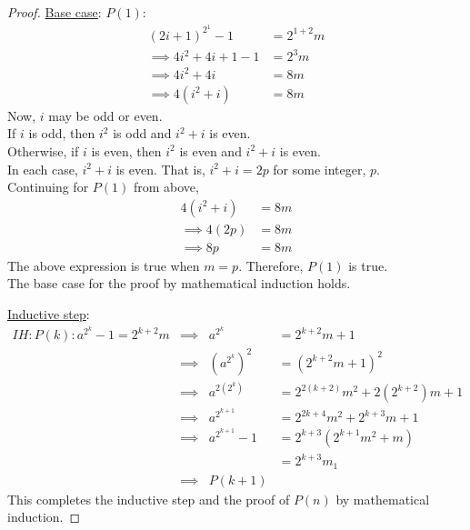 \documentclass[a4paper]{exam}
\begin{document}
\begin{questions}
\begin{parts}
\begin{solution}
\begin{proof}
      \underline{Base case}: $P(1)$:
      \begin{align*}
        (2i+1)^{2^1} -1 &= 2^{1+2}m\\
        \implies 4i^2+4i+1-1 &= 2^3m\\
        \implies 4i^2+4i &= 8m\\
        \implies 4(i^2+i) &= 8m
        \end{align*}
        Now, $i$ may be odd or even.\\
        If $i$ is odd, then $i^2$ is odd and $i^2+i$ is even.\\
        Otherwise, if $i$ is even, then $i^2$ is even and $i^2+i$ is even.\\
        In each case, $i^2+i$ is even. That is, $i^2+i=2p$ for some integer, $p$.\\
        Continuing for $P(1)$ from above,
      \begin{align*}
        4(i^2+i) &= 8m\\
        \implies 4(2p) &= 8m\\
        \implies 8p &= 8m
        \end{align*}
        The above expression is true when $m=p$. Therefore, $P(1)$ is true.\\
        The base case for the proof by mathematical induction holds.

        \underline{Inductive step}:\\
        \begin{align*}
          IH: P(k) : a^{2^k}-1 = 2^{k+2}m & \implies & a^{2^k} & = 2^{k+2}m+1 \\
                                          & \implies & (a^{2^k})^2 & = (2^{k+2}m+1)^2 \\
                                          & \implies & a^{2(2^k)} & = 2^{2(k+2)}m^2+2(2^{k+2})m+1 \\
                                          & \implies & a^{2^{k+1}} & = 2^{2k+4}m^2+2^{k+3}m + 1\\
                                          & \implies & a^{2^{k+1}} - 1 & = 2^{k+3}(2^{k+1}m^2+m)\\
                                          &  &  & = 2^{k+3}m_1\\
                                          & \implies & P(k+1)
        \end{align*}
        This completes the inductive step and the proof of $P(n)$ by mathematical induction.
      \end{proof}
    \end{solution}
    

\end{parts}
\end{questions}
\end{document}
